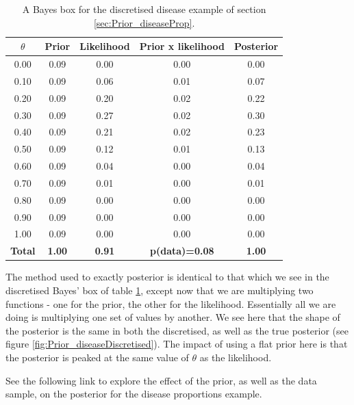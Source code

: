 \documentclass[11pt,fullpage]{book}
\begin{document}
\begin{table}[htbp]
  \centering
    \begin{tabular}{ccccc}
    \toprule
    \textbf{$\theta$} & \textbf{Prior} & \textbf{Likelihood} & \textbf{Prior x likelihood} & \textbf{Posterior} \\
    \midrule
    0.00  & 0.09  & 0.00  & 0.00  & 0.00 \\
    0.10  & 0.09  & 0.06  & 0.01  & 0.07 \\
    0.20  & 0.09  & 0.20  & 0.02  & 0.22 \\
    0.30  & 0.09  & 0.27  & 0.02  & 0.30 \\
    0.40  & 0.09  & 0.21  & 0.02  & 0.23 \\
    0.50  & 0.09  & 0.12  & 0.01  & 0.13 \\
    0.60  & 0.09  & 0.04  & 0.00  & 0.04 \\
    0.70  & 0.09  & 0.01  & 0.00  & 0.01 \\
    0.80  & 0.09  & 0.00  & 0.00  & 0.00 \\
    0.90  & 0.09  & 0.00  & 0.00  & 0.00 \\
    1.00  & 0.09  & 0.00  & 0.00  & 0.00 \\
    \bottomrule
    \textbf{Total} & \textbf{1.00} & \textbf{0.91} & \textbf{p(data)=0.08} & \textbf{1.00} \\
    \bottomrule
    \end{tabular}%
  \caption{A Bayes box for the discretised disease example of section \ref{sec:Prior_diseaseProp}.}\label{tab:Prior_BayesDiscretised}%
\end{table}%

The method used to exactly posterior is identical to that which we see in the discretised Bayes' box of table \ref{tab:Prior_BayesDiscretised}, except now that we are multiplying two functions - one for the prior, the other for the likelihood. Essentially all we are doing is multiplying one set of values by another. We see here that the shape of the posterior is the same in both the discretised, as well as the true posterior (see figure \ref{fig:Prior_diseaseDiscretised}). The impact of using a flat prior here is that the posterior is peaked at the same value of $\theta$ as the likelihood. 

 See the following link to explore the effect of the prior, as well as the data sample, on the posterior for the disease proportions example.
\end{document}

